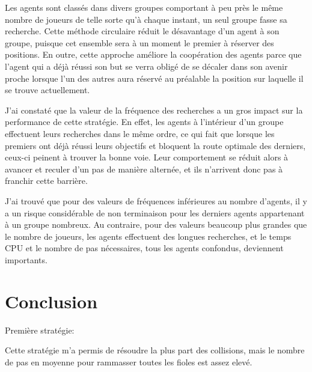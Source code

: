 \documentclass[letterpaper]{article}
\begin{document}
Les agents sont class\'es dans divers groupes comportant \`a peu pr\`es le m\^eme nombre de joueurs de telle sorte qu'\`a chaque instant, un seul groupe fasse sa recherche. 
Cette m\'ethode circulaire r\'eduit le d\'esavantage d'un agent \`a son groupe, puisque cet ensemble sera \`a un moment le premier \`a r\'eserver des positions.
En outre, cette approche am\'eliore la coop\'eration des agents parce que l'agent qui a d\'ej\`a r\'eussi son but se verra oblig\'e de se d\'ecaler dans son avenir proche lorsque l'un des autres aura r\'eserv\'e au pr\'ealable la position sur laquelle il se trouve actuellement.

J'ai constat\'e que la valeur de la fr\'equence des recherches a un gros impact sur la performance de cette strat\'egie.
En effet, les agents \`a l'int\'erieur d'un groupe effectuent leurs recherches dans le m\^eme ordre, ce qui fait que lorsque les premiers ont d\'ej\`a r\'eussi leurs objectifs et bloquent la route optimale des derniers, ceux-ci peinent \`a trouver la bonne voie. Leur comportement se r\'eduit alors \`a avancer et reculer d'un pas de mani\`ere altern\'ee, et ils n'arrivent donc pas \`a franchir cette barri\`ere.

J'ai trouv\'e que pour des valeurs de fr\'equences inf\'erieures au nombre d'agents, il y a un risque consid\'erable de non terminaison pour les derniers agents appartenant \`a un groupe nombreux. Au contraire, pour des valeurs beaucoup plus grandes que le nombre de joueurs, les agents effectuent des longues recherches, et le temps CPU et le nombre de pas n\'ecessaires, tous les agents confondus, deviennent importants.

\section{Conclusion}
Premi\`ere strat\'egie:

Cette strat\'egie m'a permis de r\'esoudre la plus part des collisions, mais le nombre de pas en moyenne pour rammasser toutes les fioles est assez elev\'e.
\end{document}
